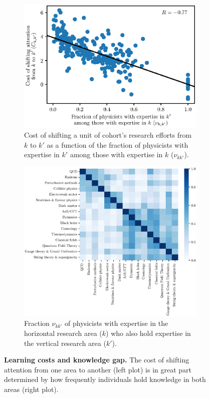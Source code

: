 \documentclass{article}
\begin{document}
\begin{figure}[h]
\begin{subfigure}{.45\textwidth}
    \centering
    \includegraphics[width=1.15\textwidth]{plots/cost_vs_nu_knowledge.eps}
    \caption{Cost of shifting a unit of cohort's research efforts from $k$ to $k'$ as a function of the fraction of physicists with expertise in $k'$ among those with expertise in $k$ ($\nu_{kk'}$).}
    \label{fig:cost_knowledge}
\end{subfigure}\hfill%
\begin{subfigure}{0.45\textwidth}
    \centering
    \includegraphics[width=1.15\textwidth]{plots/ei_R_control_nu.eps}
    \caption{Fraction $\nu_{kk'}$ of physicists with expertise in the horizontal research area ($k$) who also hold expertise in the vertical research area ($k'$).}
    \label{fig:nu}
\end{subfigure}
\caption{\textbf{Learning costs and knowledge gap.} The cost of shifting attention from one area to another (left plot) is in great part determined by how frequently individuals hold knowledge in both areas (right plot).}
\label{fig:knowledge}
\end{figure}
\end{document}
